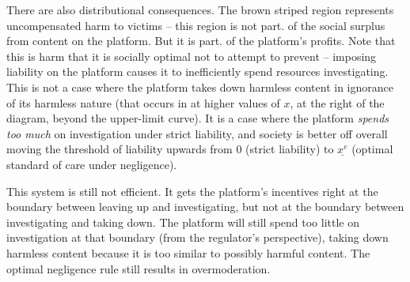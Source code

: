 There are also distributional consequences. The brown striped region represents uncompensated harm to victims -- this region is not part. of the social surplus from content on the platform. But it is part. of the platform's profits. Note that this is harm that it is socially optimal not to attempt to prevent -- imposing liability on the platform causes it to inefficiently spend resources investigating.  This is not a case where the platform takes down harmless content in ignorance of its harmless nature (that occurs in at higher values of $x$, at the right of the diagram, beyond the upper-limit curve). It is a case where the platform \emph{spends too much} on investigation under strict liability, and society is better off overall moving the threshold of liability upwards from $0$ (strict liability) to $\underline{x^e}$ (optimal standard of care under negligence).
 
This system is still not efficient. It gets the platform's incentives right at the boundary between leaving up and investigating, but not at the boundary between investigating and taking down. The platform will still spend too little on investigation at that boundary (from the regulator's perspective), taking down harmless content because it is too similar to possibly harmful content. The optimal negligence rule still results in overmoderation.

